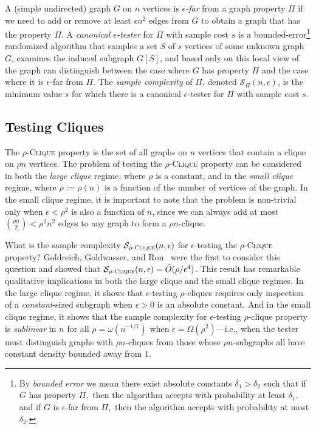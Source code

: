 \documentclass[11pt]{article}
\begin{document}
A (simple undirected) graph $G$ on $n$ vertices is \emph{$\epsilon$-far} from a graph property $\Pi$ if we need to add or remove at least $\epsilon n^2$ edges from $G$ to obtain a graph that has the property $\Pi$. 
A \emph{canonical $\epsilon$-tester} for $\Pi$ with sample cost $s$ is a bounded-error\footnote{By \emph{bounded error} we mean there exist absolute constants $\delta_1>\delta_2$ such that if $G$ has property $\Pi,$ then the algorithm accepts with probability at least $\delta_1,$ and if $G$ is $\epsilon$-far from $\Pi,$ then the algorithm accepts with probability at most $\delta_2.$} randomized algorithm that samples a set $S$ of $s$ vertices of some unknown graph $G$, examines the induced subgraph $G[S]$, and based only on this local view of the graph can distinguish between the case where $G$ has property $\Pi$ and the case where it is $\epsilon$-far from $\Pi$.
The \emph{sample complexity} of $\Pi$, denoted $\mathcal{S}_{\Pi}(n,\epsilon)$, is the minimum value $s$ for which there is a canonical $\epsilon$-tester for $\Pi$ with sample cost $s$.


\subsection{Testing Cliques}

The \textsc{$\rho$-Clique} property is the set of all graphs on $n$ vertices that contain a clique on $\rho n$ vertices. 
The problem of testing the \textsc{$\rho$-Clique} property can be considered in both the \emph{large clique} regime, where $\rho$ is a constant, and in the \emph{small clique} regime, where $\rho := \rho(n)$ is a function of the number of vertices of the graph. In the small clique regime, it is important to note that the problem is non-trivial only when $\epsilon < \rho^2$ is also a function of $n$, since we can always add at most $\binom{\rho n}{2} < \rho^2 n^2$ edges to any graph to form a $\rho n$-clique.

What is the sample complexity $\mathcal{S}_{\rho\textsc{-Clique}}(n,\epsilon)$ for $\epsilon$-testing the \textsc{$\rho$-Clique} property? 
Goldreich, Goldwasser, and Ron~\cite{goldreichPropertyTesting1998} were the first to consider this question and showed that $\mathcal{S}_{\rho\textsc{-Clique}}(n,\epsilon) = \tilde{O}(\rho/\epsilon^4)$. 
This result has remarkable qualitative implications in both the large clique and the small clique regimes.
In the large clique regime, it shows that $\epsilon$-testing $\rho$-cliques requires only inspection of a \emph{constant}-sized subgraph when $\epsilon > 0$ is an absolute constant. 
And in the small clique regime, it shows that the sample complexity for $\epsilon$-testing $\rho$-clique property is \emph{sublinear} in $n$ for all $\rho = \omega(n^{-1/7})$ when $\epsilon = \Omega(\rho^2)$---i.e., when the tester must distinguish graphs with $\rho n$-cliques from those whose $\rho n$-subgraphs all have constant density bounded away from $1$. 
\end{document}
